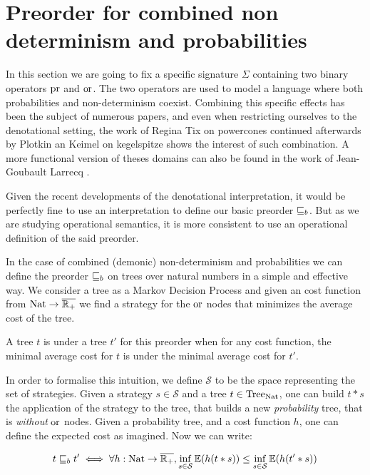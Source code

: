 \section{Preorder for combined non determinism and probabilities}

In this section we are going to fix a specific signature $\Sigma$
containing two binary operators $\operatorname{pr}$ and $\operatorname{or}$. The two
operators are used to model a language where both probabilities 
and non-determinism coexist. Combining this specific effects has been 
the subject of numerous papers, and even when restricting ourselves to the 
denotational setting, the work of Regina Tix on powercones \cite{tix2009semantic} 
continued afterwards by Plotkin an Keimel \cite{KeimelP2016} on kegelspitze
shows the interest of such combination.
A more functional version of theses domains can also be found in the work of Jean-Goubault Larrecq 
\cite{JGL-mscs16}.

Given the recent developments of the denotational interpretation, 
it would be perfectly fine to use an interpretation 
to define our basic preorder $\sqsubseteq_b$. But as we are studying 
operational semantics, it is more consistent to use an operational 
definition of the said preorder.

In the case of combined (demonic) non-determinism and probabilities we can define 
the preorder $\sqsubseteq_b$ on trees over natural numbers in a simple and
effective way. We consider a tree as a Markov Decision Process 
and given an cost function from $\textnormal{Nat} \to \overline{\mathbb{R}_+}$
we find a strategy for the $\operatorname{or}$ nodes that minimizes the average
cost of the tree. 

A tree $t$ is under a tree $t'$ for this preorder when for any 
cost function, the minimal average cost for $t$ is under the 
minimal average cost for $t'$.

In order to formalise this intuition,
we define $\mathcal{S}$ to be the space representing 
the set of strategies. Given a strategy $s \in \mathcal{S}$ and 
a tree $t \in \textnormal{Tree}_{\textnormal{Nat}}$, one can build $t*s$ the application of 
the strategy to the tree, that builds a new \emph{probability} tree, that 
is \emph{without} $\operatorname{or}$ nodes. Given a probability tree, and a 
cost function $h$, one can define the expected cost as imagined. 
Now we can write:

\begin{equation*}
    t \sqsubseteq_b t' \iff 
    \forall h : \textnormal{Nat} \to \overline{\mathbb{R}_+}, 
    \inf_{s \in \mathcal{S}} \mathbb{E}(h(t*s)) \leq 
    \inf_{s \in \mathcal{S}} \mathbb{E}(h(t'*s))
\end{equation*}

